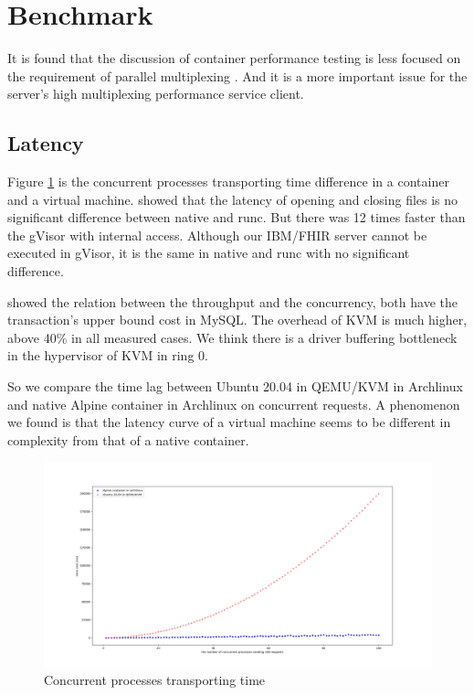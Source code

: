 \section{Benchmark}
It is found that the discussion of container performance testing is less
focused on the requirement of parallel multiplexing
\cite{7371699,KOZHIRBAYEV2017175,7095802,234857}. And it is a more
important issue for the server's high multiplexing performance service client.

\subsection{Latency}
Figure \ref{conc} is the concurrent processes transporting time
difference in a container and a virtual machine.
\textcite{234857} showed that the latency of opening and closing files
is no significant difference between native and runc. But there was 12 times
faster than the gVisor with internal access. Although our IBM/FHIR server
cannot be executed in gVisor, it is the same in native and runc with no
significant difference.

\textcite{7095802} showed the relation between the throughput and the concurrency,
both have the transaction's upper bound cost in MySQL. The overhead of KVM is
much higher, above 40\% in all measured cases. We think there is a driver
buffering bottleneck in the hypervisor of KVM in ring 0.

So we compare the time lag between Ubuntu 20.04 in QEMU/KVM in Archlinux
and native Alpine container in Archlinux on concurrent requests. 
A phenomenon we found is that the latency curve of a virtual
machine seems to be different in complexity from that of a native container.

\begin{figure}
    \centering
    \includegraphics[width=\textwidth]{src/concurrent.png}
    \caption{Concurrent processes transporting time}
    \label{conc}
\end{figure}
